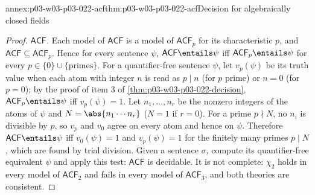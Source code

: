 \begin{annexitem}{annex:p03-w03-p03-022-acf}{thm:p03-w03-p03-022-acf}{Decision for algebraically closed fields}
\begin{proof}
\emph{\(\mathsf{ACF}\).} Each model of \(\mathsf{ACF}\) is a model of
\(\mathsf{ACF}_p\) for its characteristic \(p\), and
\(\mathsf{ACF}\subseteq\mathsf{ACF}_p\). Hence for every sentence
\(\psi\), \(\mathsf{ACF}\entails\psi\) iff \(\mathsf{ACF}_p\entails\psi\)
for every \(p\in\{0\}\cup\{\text{primes}\}\). For a quantifier-free
sentence \(\psi\), let \(v_p(\psi)\) be its truth value when each atom with
integer \(n\) is read as \(p\mid n\) (for \(p\) prime) or \(n=0\) (for
\(p=0\)); by the proof of item 3 of
\cref{thm:p03-w03-p03-022-decision}, \(\mathsf{ACF}_p\entails\psi\) iff
\(v_p(\psi)=1\). Let \(n_1,\ldots,n_r\) be the nonzero integers of the atoms
of \(\psi\) and \(N=\abs{n_1\cdots n_r}\) (\(N=1\) if \(r=0\)). For a prime
\(p\nmid N\), no \(n_i\) is divisible by \(p\), so \(v_p\) and \(v_0\) agree
on every atom and hence on \(\psi\). Therefore \(\mathsf{ACF}\entails\psi\)
iff \(v_0(\psi)=1\) and \(v_p(\psi)=1\) for the finitely many primes
\(p\mid N\), which are found by trial division. Given a sentence
\(\sigma\), compute its quantifier-free equivalent \(\psi\) and apply this
test: \(\mathsf{ACF}\) is decidable. It is not complete: \(\chi_2\) holds
in every model of \(\mathsf{ACF}_2\) and fails in every model of
\(\mathsf{ACF}_3\), and both theories are consistent.
\end{proof}
\end{annexitem}

